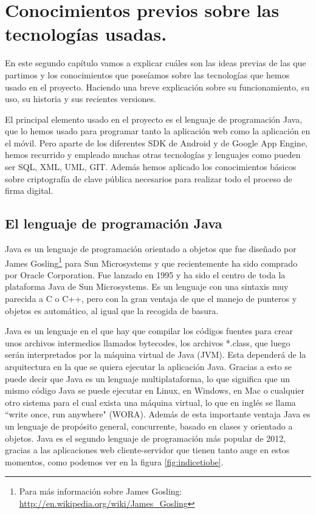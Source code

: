 \chapter[Conocimientos previos]{Conocimientos previos sobre las tecnologías usadas.}\label{cap:conocimientos}

En este segundo capítulo vamos a explicar cuáles son las ideas previas de las que partimos y los conocimientos que poseíamos sobre las tecnologías que hemos usado en el proyecto. Haciendo una breve explicación sobre su funcionamiento, su uso, su historia y sus recientes versiones.

El principal elemento usado en el proyecto es el lenguaje de programación Java, que lo hemos usado para programar tanto la aplicación web como la aplicación en el móvil. Pero aparte de los diferentes SDK de Android y de Google App Engine, hemos recurrido y empleado muchas otras tecnologías y lenguajes como pueden ser SQL, XML, UML, GIT. Además hemos aplicado los conocimientos básicos sobre criptografía de clave pública necesarios para realizar todo el proceso de firma digital.   

\section{El lenguaje de programación Java}

Java es un lenguaje de programación orientado a objetos que fue diseñado por James Gosling\footnote{ Para más información sobre James Gosling: \url{http://en.wikipedia.org/wiki/James\_Gosling}} para Sun Microsystems y que recientemente ha sido comprado por Oracle Corporation. Fue lanzado en 1995 y ha sido el centro de toda la plataforma Java de Sun Microsystems. Es un lenguaje con una sintaxis muy parecida a C o C++, pero con la gran ventaja de que el manejo de punteros y objetos es automático, al igual que la recogida de basura.

Java es un lenguaje en el que hay que compilar los códigos fuentes para crear unos archivos intermedios llamados bytecodes, los archivos *.class, que luego serán interpretados por la máquina virtual de Java (JVM). Esta dependerá de la arquitectura en la que se quiera ejecutar la aplicación Java. Gracias a esto se puede decir que Java es un lenguaje multiplataforma, lo que significa que un mismo código Java se puede ejecutar en Linux, en Windows, en Mac o cualquier otro sistema para el cual exista una máquina virtual, lo que en inglés se llama ``write once, run anywhere" (WORA). Además de esta importante ventaja Java es un lenguaje de propósito general, concurrente, basado en clases y orientado a objetos. Java es el segundo lenguaje de programación más popular de 2012, gracias a las aplicaciones web cliente-servidor que tienen tanto auge en estos momentos, como podemos ver en la figura \ref{fig:indicetiobe}.

